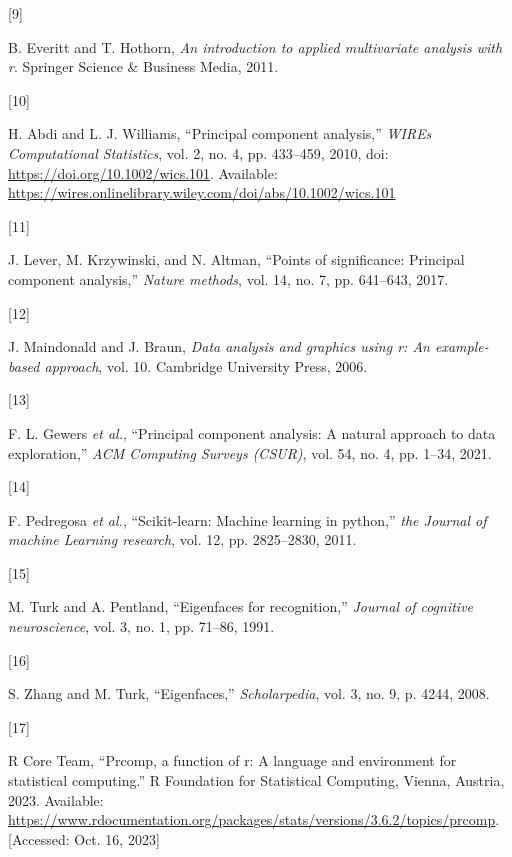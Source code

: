 \documentclass[
  letterpaper,
  DIV=11,
  numbers=noendperiod]{scrreprt}
\newlength{\cslhangindent}
\newlength{\csllabelwidth}
\newlength{\cslentryspacingunit} %
\newenvironment{CSLReferences}[2] %
 {%
  \setlength{\parindent}{0pt}
  \ifodd #1
  \let\oldpar\par
  \def\par{\hangindent=\cslhangindent\oldpar}
  \fi
  \setlength{\parskip}{#2\cslentryspacingunit}
 }%
 {}
\newcommand{\CSLLeftMargin}[1]{\parbox[t]{\csllabelwidth}{#1}}
\newcommand{\CSLRightInline}[1]{\parbox[t]{\linewidth - \csllabelwidth}{#1}\break}
\begin{document}
\begin{CSLReferences}{0}{0}
\leavevmode{}%
\CSLLeftMargin{{[}9{]} }%
\CSLRightInline{B. Everitt and T. Hothorn, \emph{An introduction to
applied multivariate analysis with r}. Springer Science \& Business
Media, 2011.}

\leavevmode{}%
\CSLLeftMargin{{[}10{]} }%
\CSLRightInline{H. Abdi and L. J. Williams, {``Principal component
analysis,''} \emph{WIREs Computational Statistics}, vol. 2, no. 4, pp.
433--459, 2010, doi: \url{https://doi.org/10.1002/wics.101}. Available:
\url{https://wires.onlinelibrary.wiley.com/doi/abs/10.1002/wics.101}}

\leavevmode{}%
\CSLLeftMargin{{[}11{]} }%
\CSLRightInline{J. Lever, M. Krzywinski, and N. Altman, {``Points of
significance: Principal component analysis,''} \emph{Nature methods},
vol. 14, no. 7, pp. 641--643, 2017.}

\leavevmode{}%
\CSLLeftMargin{{[}12{]} }%
\CSLRightInline{J. Maindonald and J. Braun, \emph{Data analysis and
graphics using r: An example-based approach}, vol. 10. Cambridge
University Press, 2006.}

\leavevmode{}%
\CSLLeftMargin{{[}13{]} }%
\CSLRightInline{F. L. Gewers \emph{et al.}, {``Principal component
analysis: A natural approach to data exploration,''} \emph{ACM Computing
Surveys (CSUR)}, vol. 54, no. 4, pp. 1--34, 2021.}

\leavevmode{}%
\CSLLeftMargin{{[}14{]} }%
\CSLRightInline{F. Pedregosa \emph{et al.}, {``Scikit-learn: Machine
learning in python,''} \emph{the Journal of machine Learning research},
vol. 12, pp. 2825--2830, 2011.}

\leavevmode{}%
\CSLLeftMargin{{[}15{]} }%
\CSLRightInline{M. Turk and A. Pentland, {``Eigenfaces for
recognition,''} \emph{Journal of cognitive neuroscience}, vol. 3, no. 1,
pp. 71--86, 1991.}

\leavevmode{}%
\CSLLeftMargin{{[}16{]} }%
\CSLRightInline{S. Zhang and M. Turk, {``Eigenfaces,''}
\emph{Scholarpedia}, vol. 3, no. 9, p. 4244, 2008.}

\leavevmode{}%
\CSLLeftMargin{{[}17{]} }%
\CSLRightInline{R Core Team, {``Prcomp, a function of r: A language and
environment for statistical computing.''} R Foundation for Statistical
Computing, Vienna, Austria, 2023. Available:
\url{https://www.rdocumentation.org/packages/stats/versions/3.6.2/topics/prcomp}.
{[}Accessed: Oct. 16, 2023{]}}


\end{CSLReferences}
\end{document}
